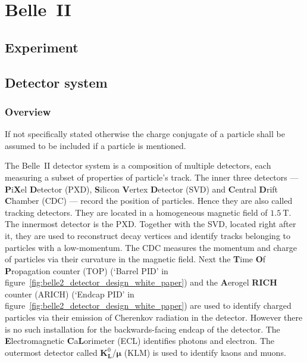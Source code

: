 \chapter{Belle~\RN{2}}
\label{chap:belle2_experiment}

\section{Experiment}
\label{sec:experimental}

\section{Detector system}
\label{sec:detector_system}

\subsection{Overview}
\label{subsec:detector_system_overview}

If not specifically stated otherwise the charge conjugate of a particle shall be assumed to be included if a particle is mentioned.

The Belle~\RN{2} detector system is a composition of multiple detectors, each measuring a subset of properties of particle's track.
The inner three detectors --- \textbf{P}i\textbf{X}el \textbf{D}etector (PXD), \textbf{S}ilicon \textbf{V}ertex \textbf{D}etector (SVD) and \textbf{C}entral \textbf{D}rift \textbf{C}hamber (CDC) --- record the position of particles. Hence they are also called tracking detectors. They are located in a homogeneous magnetic field of $1.5~\mathrm{T}$.
The innermost detector is the PXD. Together with the SVD, located right after it, they are used to reconstruct decay vertices and identify tracks belonging to particles with a low-momentum.
The CDC measures the momentum and charge of particles via their curvature in the magnetic field.
Next the \textbf{T}ime \textbf{O}f \textbf{P}ropagation counter (TOP) (`Barrel PID' in figure~\ref{fig:belle2_detector_design_white_paper}) and the \textbf{A}erogel \textbf{RICH} counter (ARICH) (`Endcap PID' in figure~\ref{fig:belle2_detector_design_white_paper}) are used to identify charged particles via their emission of Cherenkov radiation in the detector. However there is no such installation for the backwards-facing endcap of the detector.
The \textbf{E}lectromagnetic \textbf{C}a\textbf{L}orimeter (ECL) identifies photons and electron.
The outermost detector called $\boldsymbol{K}^0_{\boldsymbol{L}}$/$\boldsymbol{\mu}$ (KLM) is used to identify kaons and muons.

